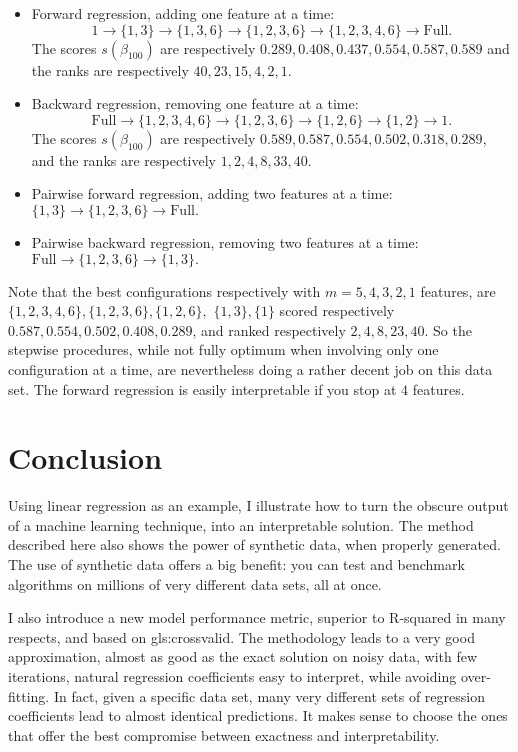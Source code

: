 \documentclass[oneside,10pt]{book}
\begin{document}
\begin{itemize}
\item Forward regression, adding one feature at a time: 
$$1 \rightarrow \{1, 3\} \rightarrow \{1, 3, 6\} \rightarrow \{1, 2, 3, 6\}
 \rightarrow \{1, 2, 3, 4, 6\}  \rightarrow \text{Full}.$$   
The scores $s(\beta_{100})$ are respectively $0.289,0.408, 0.437, 0.554, 0.587, 0.589$ and the ranks 
are respectively $40, 23, 15, 4, 2, 1$. 

\item Backward regression, removing one feature at a time: 
$$\text{Full} \rightarrow \{1, 2, 3, 4, 6\} 
\rightarrow \{1, 2, 3, 6\} \rightarrow \{1, 2, 6\} \rightarrow \{1, 2\} \rightarrow 1.$$ 
The scores $s(\beta_{100})$ are respectively $0.589, 0.587, 0.554, 0.502, 0.318, 0.289$, and the ranks 
are respectively $1, 2, 4, 8, 33, 40$. 

\item Pairwise forward regression, adding two features at a time:   $\{1,3\} \rightarrow \{1,2,3,6\} \rightarrow \text{Full}.$

\item Pairwise backward regression, removing two features at a time: $\text{Full} \rightarrow \{1,2,3,6\} \rightarrow \{1,3\}.$
\end{itemize}
Note that the best configurations respectively with $m=5, 4, 3, 2, 1$ features, are $\{1, 2, 3, 4, 6\}, \{1, 2, 3, 6\}, \{1, 2, 6\},$ $\{1, 3\}, \{1\}$ scored respectively $0.587, 0.554, 0.502, 0.408, 0.289$, and ranked respectively $2, 4, 8, 23, 40$. So the stepwise procedures,
while not fully optimum when involving only one configuration at a time, are nevertheless doing a rather decent job on this data set. The forward regression is easily  interpretable if you stop at $4$ features.

\section{Conclusion}

Using linear regression as an example, I illustrate how to turn the obscure output of a machine learning technique, into an interpretable solution.  The method described here also shows the power of synthetic data, when properly generated. The use of synthetic data offers a big benefit: you can test and benchmark algorithms on millions of very different data sets, all at once. 

I also introduce a new model performance metric, superior to R-squared in many respects, and based on \gls{gls:crossvalid}. 
The methodology leads to a very good approximation, almost as good as the exact solution on noisy data, with few iterations, natural regression coefficients easy to interpret, while avoiding over-fitting. In fact, given a specific data set, many very different sets of regression coefficients lead to almost identical predictions. It makes sense to choose the ones that offer the best compromise between exactness and interpretability. 
\end{document}
